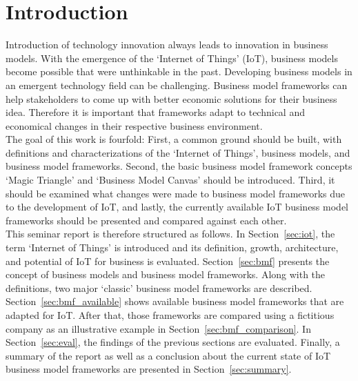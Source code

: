 \section{Introduction}
\vspace{-1em}
	Introduction of technology innovation always leads to innovation in business models. With the emergence of the `Internet of Things' (IoT), business models become possible that were unthinkable in the past. Developing business models in an emergent technology field can be challenging. Business model frameworks can help stakeholders to come up with better economic solutions for their business idea. Therefore it is important that frameworks adapt to technical and economical changes in their respective business environment.\\
	The goal of this work is fourfold: First, a common ground should be built, with definitions and characterizations of the `Internet of Things', business models, and business model frameworks. Second, the basic business model framework concepts `Magic Triangle' and `Business Model Canvas' should be introduced. Third, it should be examined what changes were made to business model frameworks due to the development of IoT, and lastly, the currently available IoT business model frameworks should be presented and compared against each other.\\
	This seminar report is therefore structured as follows. In Section~\ref{sec:iot}, the term `Internet of Things' is introduced and its definition, growth, architecture, and potential of IoT for business is evaluated. Section~\ref{sec:bmf} presents the concept of business models and business model frameworks. Along with the definitions, two major `classic' business model frameworks are described. Section~\ref{sec:bmf_available} shows available business model frameworks that are adapted for IoT. After that, those frameworks are compared using a fictitious company as an illustrative example in Section~\ref{sec:bmf_comparison}. In Section~\ref{sec:eval}, the findings of the previous sections are evaluated. Finally, a summary of the report as well as a conclusion about the current state of IoT business model frameworks are presented in Section~\ref{sec:summary}.
\vspace{-1em}
